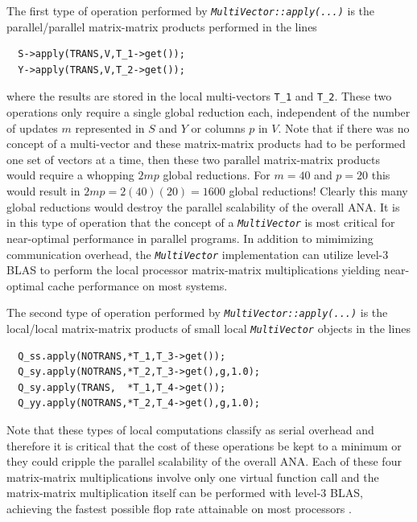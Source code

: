 The first type of operation performed by
{}\texttt{\textit{Multi\-Vector\-::apply(\-...)}} is the
parallel/parallel matrix-matrix products performed in the lines

{\scriptsize\begin{verbatim}
  S->apply(TRANS,V,T_1->get());
  Y->apply(TRANS,V,T_2->get());
\end{verbatim}}

{}\noindent{}where the results are stored in the local multi-vectors
{}\texttt{T\_1} and {}\texttt{T\_2}.  These two operations only
require a single global reduction each, independent of the number of
updates $m$ represented in $S$ and $Y$ or columns $p$ in $V$.  Note
that if there was no concept of a multi-vector and these matrix-matrix
products had to be performed one set of vectors at a time, then these
two parallel matrix-matrix products would require a whopping $2 m p$
global reductions.  For $m = 40$ and $p = 20$ this would result in $2
m p = 2(40)(20) = 1600$ global reductions!  Clearly this many global
reductions would destroy the parallel scalability of the overall ANA.
It is in this type of operation that the concept of a
{}\texttt{\textit{Multi\-Vector}} is most critical for near-optimal
performance in parallel programs.  In addition to mimimizing
communication overhead, the {}\texttt{\textit{Multi\-Vector}}
implementation can utilize level-3 BLAS to perform the local processor
matrix-matrix multiplications yielding near-optimal cache performance
on most systems.

The second type of operation performed by
{}\texttt{\textit{Multi\-Vector\-::apply(\-...)}} is the local/local
matrix-matrix products of small local
{}\texttt{\textit{Multi\-Vector}} objects in the lines

{\scriptsize\begin{verbatim}
  Q_ss.apply(NOTRANS,*T_1,T_3->get());
  Q_sy.apply(NOTRANS,*T_2,T_3->get(),g,1.0);
  Q_sy.apply(TRANS,  *T_1,T_4->get());
  Q_yy.apply(NOTRANS,*T_2,T_4->get(),g,1.0);
\end{verbatim}}

{}\noindent{}Note that these types of local computations classify as
serial overhead and therefore it is critical that the cost of these
operations be kept to a minimum or they could cripple the parallel
scalability of the overall ANA.  Each of these four matrix-matrix
multiplications involve only one virtual function call and the
matrix-matrix multiplication itself can be performed with level-3
BLAS, achieving the fastest possible flop rate attainable on most
processors {}\cite{ref:demmel_1997}.

